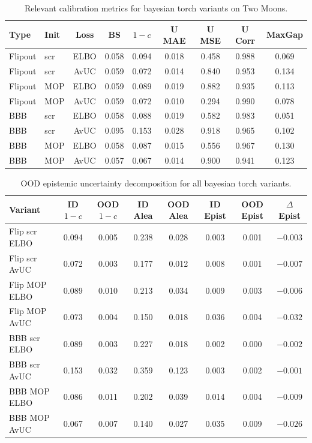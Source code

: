 \documentclass[conference]{IEEEtran}
\begin{document}
\begin{table}[H]
  \centering
  \caption{Relevant calibration metrics for bayesian torch variants on Two Moons.}
  \label{tab:bnn_main_subset}
  \small\setlength{\tabcolsep}{4pt}
  \begin{tabular}{llccccccc}
    \toprule
    Type & Init & Loss & BS & $1 - c$ & U MAE & U MSE & U Corr & MaxGap \\
    \midrule
    Flipout & scr & ELBO & 0.058 & 0.094 & 0.018 & 0.458 & 0.988 & 0.069 \\
    Flipout & scr & AvUC & 0.059 & 0.072 & 0.014 & 0.840 & 0.953 & 0.134 \\
    Flipout & MOP & ELBO & 0.059 & 0.089 & 0.019 & 0.882 & 0.935 & 0.113 \\
    Flipout & MOP & AvUC & 0.059 & 0.072 & 0.010 & 0.294 & 0.990 & 0.078 \\
    BBB & scr & ELBO & 0.058 & 0.088 & 0.019 & 0.582 & 0.983 & 0.051 \\
    BBB & scr & AvUC & 0.095 & 0.153 & 0.028 & 0.918 & 0.965 & 0.102 \\
    BBB & MOP & ELBO & 0.058 & 0.087 & 0.015 & 0.556 & 0.967 & 0.130 \\
    BBB & MOP & AvUC & 0.057 & 0.067 & 0.014 & 0.900 & 0.941 & 0.123 \\
    \bottomrule
  \end{tabular}
\end{table}

\begin{table}[H]
  \centering
  \caption{OOD epistemic uncertainty decomposition for all bayesian torch variants.}
  \label{tab:ood}
  \small\setlength{\tabcolsep}{4pt}
  \begin{tabular}{lccccccc}
    \toprule
    Variant & ID $1 - c$ & OOD $1 - c$ & ID Alea & OOD Alea & ID Epist & OOD Epist & $\Delta$Epist \\
    \midrule
    Flip scr ELBO & 0.094 & 0.005 & 0.238 & 0.028 & 0.003 & 0.001 & $-0.003$ \\
    Flip scr AvUC & 0.072 & 0.003 & 0.177 & 0.012 & 0.008 & 0.001 & $-0.007$ \\
    Flip MOP ELBO & 0.089 & 0.010 & 0.213 & 0.034 & 0.009 & 0.003 & $-0.006$ \\
    Flip MOP AvUC & 0.073 & 0.004 & 0.150 & 0.018 & 0.036 & 0.004 & $-0.032$ \\
    BBB scr ELBO  & 0.089 & 0.003 & 0.227 & 0.018 & 0.002 & 0.000 & $-0.002$ \\
    BBB scr AvUC  & 0.153 & 0.032 & 0.359 & 0.123 & 0.003 & 0.002 & $-0.001$ \\
    BBB MOP ELBO  & 0.086 & 0.011 & 0.202 & 0.039 & 0.014 & 0.004 & $-0.009$ \\
    BBB MOP AvUC  & 0.067 & 0.007 & 0.140 & 0.027 & 0.035 & 0.009 & $-0.026$ \\
    \bottomrule
  \end{tabular}
\end{table}
\end{document}
